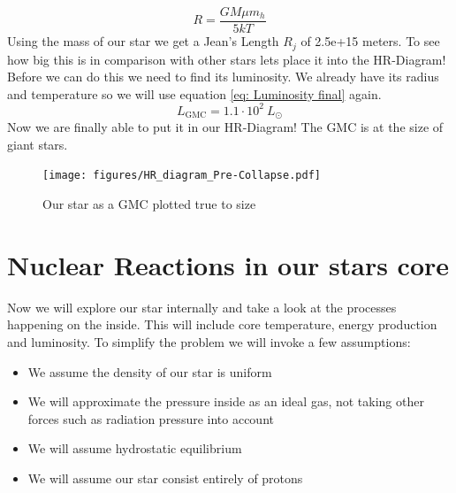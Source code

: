 \documentclass[reprint,english,notitlepage]{revtex4-2}
\begin{document}
\begin{equation}\label{eq: Jeans length}
  R = \frac{GMμ m_h }{5kT} 
\end{equation}
Using the mass of our star we get a Jean's Length $ R_j $ of 2.5e+15 meters. To see how big this is in comparison with other stars lets place it into the HR-Diagram! Before we can do this we need to find its luminosity. We already have its radius and temperature so we will use equation \ref{eq: Luminosity final} again. 
\begin{equation}
  L_{\text{GMC}} = 1.1 ⋅ 10^{2}\ L_{⊙}
\end{equation}
Now we are finally able to put it in our HR-Diagram! The GMC is at the size of giant stars. 
\begin{figure}[h!]
  \centering
  \texttt{[image: figures/HR\_diagram\_Pre-Collapse.pdf]}
  \caption{Our star as a GMC plotted true to size}
  \label{fig:figure1}
\end{figure}

\section{Nuclear Reactions in our stars core}
Now we will explore our star internally and take a look at the processes happening on the inside. This will include core temperature, energy production and luminosity. To simplify the problem we will invoke a few assumptions: 
\begin{itemize}
  \item We assume the density of our star is uniform
  \item We will approximate the pressure inside as an ideal gas, not taking other forces such as radiation pressure into account
  \item We will assume hydrostatic equilibrium
  \item We will assume our star consist entirely of protons 
\end{itemize}
\end{document}
